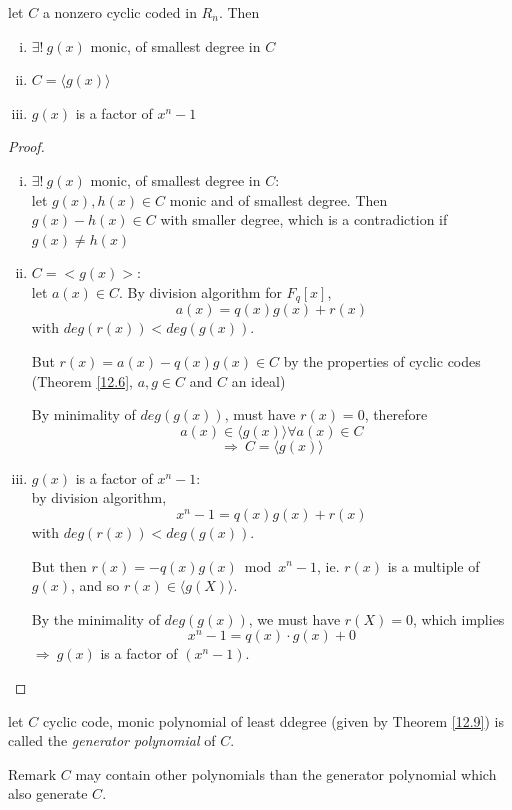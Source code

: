 \documentclass{article}
\theoremstyle{definition}
\newenvironment{defn}[1]
{\renewcommand\theinnerdefn{#1}\innerdefn}
{\endinnerdefn}
\newenvironment{thm}[1]
{\renewcommand\theinnerthm{#1}\innerthm}
{\endinnerthm}
\begin{document}
\begin{thm}{12.9} \label{12.9}
  let $C$ a nonzero cyclic coded in $R_n$. Then
  \begin{enumerate}[i.]
    \item $\exists !~ g(x)$ monic, of smallest degree in $C$
    \item $C=\langle g(x) \rangle$
    \item $g(x)$ is a factor of $x^n -1$
  \end{enumerate}
\end{thm}
\begin{proof}
  \begin{enumerate}[i.]
    \item $\exists !~ g(x)$ monic, of smallest degree in $C$:\\
      let $g(x), h(x) \in C$ monic and of smallest degree. Then $g(x)-h(x) \in C$ with smaller degree, which is a contradiction if $g(x) \neq h(x)$

    \item $C=<g(x)>$:\\
      let $a(x) \in C$. By division algorithm for $F_q[x]$,
      $$a(x) = q(x) g(x) + r(x)$$
      with $deg(r(x)) < deg(g(x))$.

      But $r(x) = a(x) - q(x)g(x) \in C$ by the properties of cyclic codes (Theorem \ref{12.6}, $a,g \in C$ and $C$ an ideal)

      By minimality of $deg(g(x))$, must have $r(x) = 0$, therefore
      $$a(x) \in \langle g(x) \rangle \forall a(x) \in C$$
      $$\Longrightarrow~ C=\langle g(x) \rangle$$

    \item $g(x)$ is a factor of $x^n -1$:\\
      by division algorithm,
      $$x^n -1 = q(x) g(x) + r(x)$$
      with $deg(r(x)) < deg(g(x))$.

      But then $r(x) = -q(x) g(x) \bmod{x^n -1}$, ie. $r(x)$ is a multiple of $g(x)$, and so $r(x) \in \langle g(X) \rangle$.

      By the minimality of $deg(g(x))$, we must have $r(X)=0$, which implies
      $$x^n -1 = q(x) \cdot g(x) + 0$$
      $\Longrightarrow~ g(x)$ is a factor of $(x^n-1)$.
  \end{enumerate}
\end{proof}


\begin{defn}{}[Generator polynomial]
  let $C$ cyclic code, monic polynomial of least ddegree (given by Theorem \ref{12.9}) is called the \emph{generator polynomial} of $C$.

  Remark $C$ may contain other polynomials than the generator polynomial which also generate $C$.
\end{defn}
\end{document}
